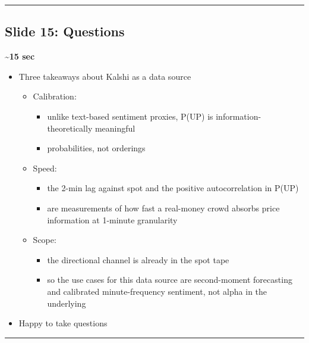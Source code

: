 \documentclass[
]{article}
\providecommand{\tightlist}{%
  \setlength{\itemsep}{0pt}\setlength{\parskip}{0pt}}
\begin{document}
\begin{center}\rule{0.5\linewidth}{0.5pt}\end{center}

\subsection{Slide 15: Questions}\label{slide-15-questions}

\textbf{\textasciitilde15 sec}

\begin{itemize}
\tightlist
\item
  Three takeaways about Kalshi as a data source

  \begin{itemize}
  \tightlist
  \item
    Calibration:

    \begin{itemize}
    \tightlist
    \item
      unlike text-based sentiment proxies, P(UP) is
      information-theoretically meaningful
    \item
      probabilities, not orderings
    \end{itemize}
  \item
    Speed:

    \begin{itemize}
    \tightlist
    \item
      the 2-min lag against spot and the positive autocorrelation in
      P(UP)
    \item
      are measurements of how fast a real-money crowd absorbs price
      information at 1-minute granularity
    \end{itemize}
  \item
    Scope:

    \begin{itemize}
    \tightlist
    \item
      the directional channel is already in the spot tape
    \item
      so the use cases for this data source are second-moment
      forecasting and calibrated minute-frequency sentiment, not alpha
      in the underlying
    \end{itemize}
  \end{itemize}
\item
  Happy to take questions
\end{itemize}

\begin{center}\rule{0.5\linewidth}{0.5pt}\end{center}
\end{document}
